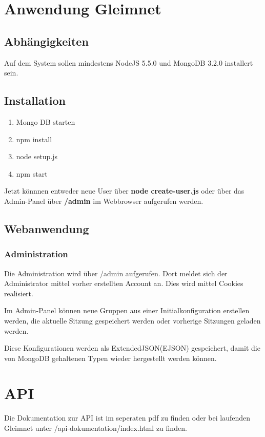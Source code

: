 \documentclass[12pt]{article} %
\begin{document}
\section{Anwendung Gleimnet}
\subsection{Abhängigkeiten}
Auf dem System sollen mindestens NodeJS 5.5.0 und MongoDB 3.2.0 installert sein.
\subsection{Installation}
\begin{enumerate}
\item Mongo DB starten
\item npm install
\item node setup.js
\item npm start
\end{enumerate}

Jetzt könnnen entweder neue User über \textbf{node create-user.js} oder über das Admin-Panel über \textbf{/admin} im Webbrowser aufgerufen werden.

\subsection{Webanwendung}
\subsubsection{Administration}
Die Administration wird über /admin aufgerufen. Dort meldet sich der Administrator mittel vorher erstellten Account an. Dies wird mittel Cookies realisiert.

Im Admin-Panel können neue Gruppen aus einer Initialkonfiguration erstellen werden, die aktuelle Sitzung gespeichert werden oder vorherige Sitzungen geladen werden.

Diese Konfigurationen werden als ExtendedJSON(EJSON) gespeichert, damit die von MongoDB gehaltenen Typen wieder hergestellt werden können.

\section{API}
Die Dokumentation zur API ist im seperaten pdf zu finden oder bei laufenden Gleimnet unter /api-dokumentation/index.html zu finden.



\end{document}
